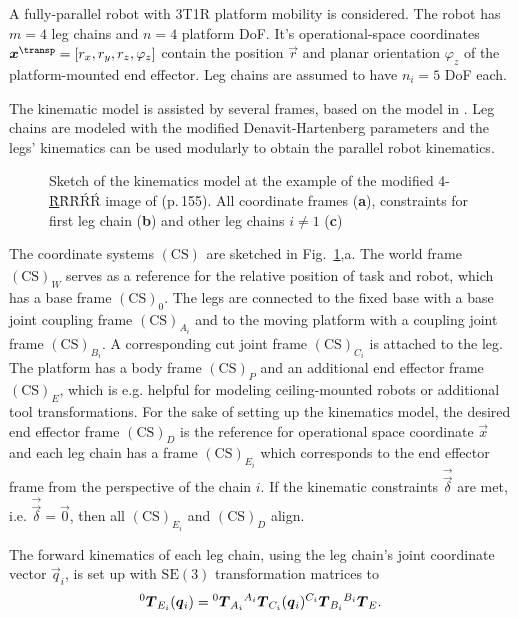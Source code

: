 \documentclass[
	graybox,
	vecphys] %
	{svmult}
\newcommand{\ks}[1]{{(\mathrm{CS})}_{#1}}
\newcommand{\ortvek}[4]{{ }_{(#1)}{\boldsymbol{#2}}^{#3}_{#4} }
\newcommand{\trmat}[2]{{{ }^{#1}\boldsymbol{T}}_{#2}}
\newcommand{\Res}[0]{\vec{\delta}}
\begin{document}
A fully-parallel robot with 3T1R platform mobility is considered.
The robot has $m=4$ leg chains and $n=4$ platform DoF.
It's operational-space coordinates $\vec{x}^\transp=[r_x,r_y,r_z,\varphi_z]$ contain the position $\vec{r}$ and planar orientation $\varphi_z$ of the platform-mounted end effector. %
Leg chains are assumed to have $n_i=5$ DoF each. %

The kinematic model is assisted by several frames, based on the model in \cite{BriotKha2015}.
Leg chains are modeled with the modified Denavit-Hartenberg parameters \cite{BriotKha2015} and the legs' kinematics can be used modularly to obtain the parallel robot kinematics.

\begin{figure}[tb]

\caption{Sketch of the kinematics model at the example of the modified 4-\underline{\`R}\`R\`R\'R\'R image of \cite{KongGos2007} (p.\,155). All coordinate frames (\textbf{a}), constraints for first leg chain (\textbf{b}) and other leg chains $i{\ne}1$ (\textbf{c})}
\label{fig:kinematic_principle}
\vspace{-0.2cm}
\end{figure}


The coordinate systems $\ks{}$ are sketched in Fig.~\ref{fig:kinematic_principle},a.
The world frame $\ks{W}$ serves as a reference for the relative position of task and robot, which has a base frame $\ks{0}$.
The legs are connected to the fixed base with a base joint coupling frame $\ks{A_i}$ and to the moving platform with a coupling joint frame $\ks{B_i}$.
A corresponding cut joint frame $\ks{C_i}$ is attached to the leg.
The platform has a body frame $\ks{P}$ and an additional end effector frame $\ks{E}$, which is e.g. helpful for modeling ceiling-mounted robots or additional tool transformations.
For the sake of setting up the kinematics model, the desired end effector frame $\ks{D}$ is the reference for operational space coordinate $\vec{x}$ and each leg chain has a frame $\ks{E_i}$ which corresponds to the end effector frame from the perspective of the chain $i$.
If the kinematic constraints $\vec{\Res}$ are met, i.e. $\vec{\Res}=\vec{0}$, then all $\ks{E_i}$ and $\ks{D}$ align.

The forward kinematics of each leg chain, using the leg chain's joint coordinate vector $\vec{q}_i$, is set up with $\mathrm{SE(3)}$ transformation matrices to
%
\vspace{-0.1cm}
\begin{equation}
\trmat{0}{E_i}(\vec{q}_i)=\trmat{0}{A_i} \trmat{A_i}{C_i}(\vec{q}_i)  \trmat{C_i}{B_i} \trmat{B_i}{E}.
\label{eq:fkine_leg}
\vspace{-0.1cm}
\end{equation}
\end{document}

